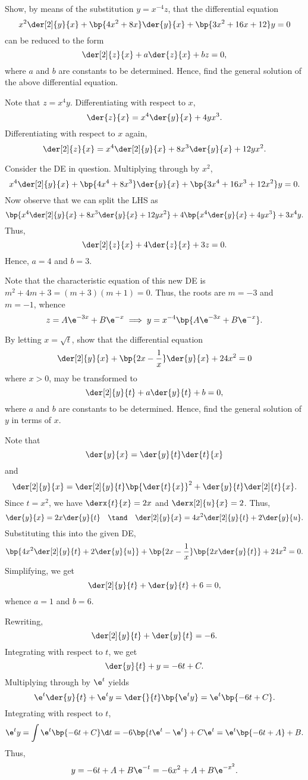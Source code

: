 \clearpage
\begin{problem}
    Show, by means of the substitution $y = x^{-4} z$, that the differential equation \[x^2 \der[2]{y}{x} + \bp{4x^2 + 8x} \der{y}{x} + \bp{3x^2 + 16x + 12} y = 0\] can be reduced to the form \[\der[2]{z}{x} + a\der{z}{x} + bz = 0,\] where $a$ and $b$ are constants to be determined. Hence, find the general solution of the above differential equation.
\end{problem}
\begin{solution}
    Note that $z = x^4y$. Differentiating with respect to $x$, \[\der{z}{x} = x^4 \der{y}{x} + 4yx^3.\] Differentiating with respect to $x$ again, \[\der[2]{z}{x} = x^4 \der[2]{y}{x} + 8x^3 \der{y}{x} + 12yx^2.\]

    Consider the DE in question. Multiplying through by $x^2$, \[x^4 \der[2]{y}{x} + \bp{4x^4 + 8x^3} \der{y}{x} + \bp{3x^4 + 16x^3 + 12x^2} y = 0.\] Now observe that we can split the LHS as \[\bp{x^4 \der[2]{y}{x} + 8x^3 \der{y}{x} + 12yx^2} + 4\bp{x^4 \der{y}{x} + 4yx^3} + 3x^4 y.\] Thus, \[\der[2]{z}{x} + 4\der{z}{x} + 3z = 0.\] Hence, $a = 4$ and $b = 3$.

    Note that the characteristic equation of this new DE is $m^2 + 4m + 3 = (m+3)(m+1) = 0$. Thus, the roots are $m =-3$ and $m =-1$, whence \[z = A\e^{-3x} + B\e^{-x} \implies y = x^{-4}\bp{A\e^{-3x} + B\e^{-x}}.\]
\end{solution}

\begin{problem}
    By letting $x = \sqrt t$, show that the differential equation \[\der[2]{y}{x} + \bp{2x - \frac1x} \der{y}{x} + 24 x^2 = 0\] where $x > 0$, may be transformed to \[\der[2]{y}{t} + a \der{y}{t} + b = 0,\] where $a$ and $b$ are constants to be determined. Hence, find the general solution of $y$ in terms of $x$.
\end{problem}
\begin{solution}
    Note that \[\der{y}{x} = \der{y}{t} \der{t}{x}\] and \[\der[2]{y}{x} = \der[2]{y}{t} \bp{\der{t}{x}}^2 + \der{y}{t} \der[2]{t}{x}.\] Since $t = x^2$, we have $\derx{t}{x} = 2x$ and $\derx[2]{u}{x} = 2$. Thus, \[\der{y}{x} = 2x \der{y}{t} \quad \tand \quad \der[2]{y}{x} = 4x^2 \der[2]{y}{t} + 2 \der{y}{u}.\] Substituting this into the given DE, \[\bp{4x^2 \der[2]{y}{t} + 2 \der{y}{u}} + \bp{2x - \frac1x} \bp{2x \der{y}{t}} + 24x^2 = 0.\] Simplifying, we get \[\der[2]{y}{t} + \der{y}{t} + 6 = 0,\] whence $a = 1$ and $b = 6$.

    Rewriting, \[\der[2]{y}{t} + \der{y}{t} = -6.\] Integrating with respect to $t$, we get \[\der{y}{t} + y = -6t + C.\] Multiplying through by $\e^t$ yields \[\e^t \der{y}{t} + \e^t y = \der{}{t} \bp{\e^t y} = \e^t \bp{-6t + C}.\] Integrating with respect to $t$, \[\e^t y = \int \e^t \bp{-6t + C} \d t = -6 \bp{t\e^t - \e^t} + C\e^t = \e^t \bp{-6t + A} + B.\] Thus, \[y = -6t + A + B\e^{-t} = -6x^2 + A + B\e^{-x^2}.\]

\end{solution}

